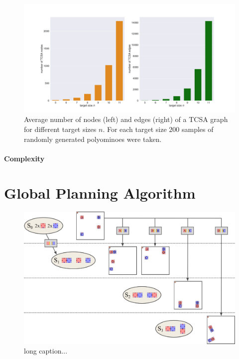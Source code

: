 \begin{figure}
	\centering
	\includegraphics[width=1\textwidth]{figures/plots/tcsa_nodes_edges.pdf}
	\caption[Average TCSA nodes and edges for target size $n$.]{Average number of nodes (left) and edges (right) of a TCSA graph for different target sizes $n$.
	For each target size $200$ samples of randomly generated polyominoes were taken.}
	\label{fig:tcsa_plot}
\end{figure}

\paragraph{Complexity}





\section{Global Planning Algorithm}
\label{sec:global_algo}


\begin{figure}
	\centering
	\includegraphics[width=1\textwidth]{figures/connect_options.pdf}
	\caption[Example of different connection options for one TCSA edge]{long caption...}
	\label{fig:connect_options}
\end{figure}

